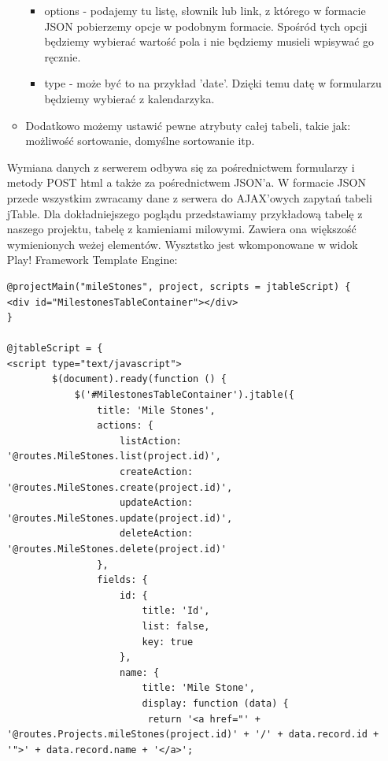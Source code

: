 \documentclass[a4paper,12pt,notitlepage]{mwrep}
\begin{document}
\begin{itemize}
\begin{itemize}
\begin{itemize}
					\item	options - podajemy tu listę, słownik lub link, z którego w formacie JSON pobierzemy opcje w podobnym 
						formacie. Spośród tych opcji będziemy wybierać wartość pola i nie będziemy musieli wpisywać go ręcznie.
					\item	type - może być to na przykład 'date'. Dzięki temu datę w formularzu będziemy wybierać z kalendarzyka.
				\end{itemize}
			\item	Dodatkowo możemy ustawić pewne atrybuty całej tabeli, takie jak: możliwość sortowanie, domyślne sortowanie itp.
		\end{itemize}
		Wymiana danych z serwerem odbywa się za pośrednictwem formularzy i metody POST html a także za pośrednictwem JSON'a. W formacie JSON 
		przede wszystkim zwracamy dane z serwera do AJAX'owych zapytań tabeli jTable. Dla dokładniejszego poglądu przedstawiamy przykładową
		tabelę z naszego projektu, tabelę z kamieniami milowymi. Zawiera ona większość wymienionych weżej elementów. Wysztstko jest 
		wkomponowane w widok Play! Framework Template Engine: \\
		
		
		\begin{verbatim}
@projectMain("mileStones", project, scripts = jtableScript) {
<div id="MilestonesTableContainer"></div>
}

@jtableScript = {
<script type="text/javascript">
        $(document).ready(function () {
            $('#MilestonesTableContainer').jtable({
                title: 'Mile Stones',
                actions: {
                    listAction: '@routes.MileStones.list(project.id)',
                    createAction: '@routes.MileStones.create(project.id)',
                    updateAction: '@routes.MileStones.update(project.id)',
                    deleteAction: '@routes.MileStones.delete(project.id)'
                },
                fields: {
                    id: {
                        title: 'Id',
                        list: false,
                        key: true
                    },
                    name: {
                        title: 'Mile Stone',
                        display: function (data) {
                         return '<a href="' + '@routes.Projects.mileStones(project.id)' + '/' + data.record.id + '">' + data.record.name + '</a>';
                        

\end{verbatim}
\end{itemize}
\end{document}
